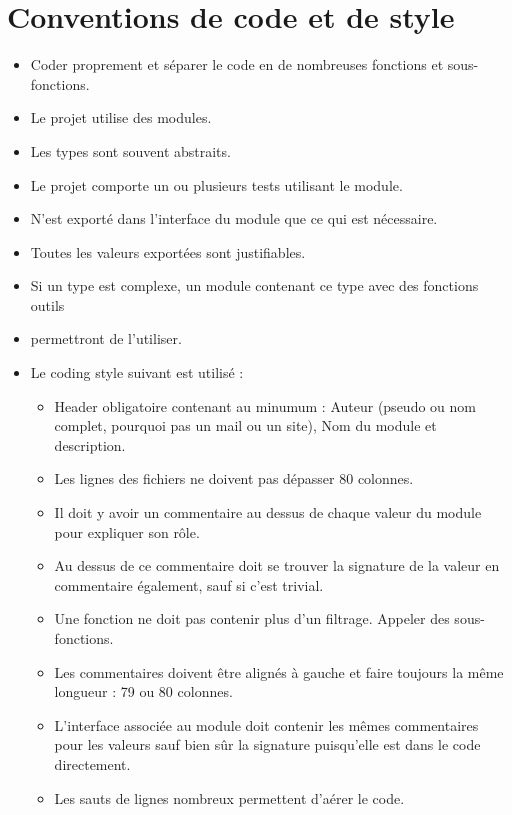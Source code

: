\documentclass{life-fr}
\begin{document}
\section{Conventions de code et de style}

\begin{itemize}
  \item Coder proprement et séparer le code en de nombreuses fonctions et sous-fonctions.
  \item Le projet utilise des modules.
  \item Les types sont souvent abstraits.
  \item Le projet comporte un ou plusieurs tests utilisant le module.
  \item N'est exporté dans l'interface du module que ce qui est nécessaire.
  \item Toutes les valeurs exportées sont justifiables.
  \item Si un type est complexe, un module contenant ce type avec des fonctions outils
  \item permettront de l'utiliser.
\newpage
  \item Le coding style suivant est utilisé :
    \begin{itemize}
      \item Header obligatoire contenant au minumum : Auteur (pseudo ou nom
        complet, pourquoi pas un mail ou un site), Nom du module et
        description.
      \item Les lignes des fichiers ne doivent pas dépasser 80 colonnes.
      \item Il doit y avoir un commentaire au dessus de chaque valeur du module
        pour expliquer son rôle.
      \item Au dessus de ce commentaire doit se trouver la signature de la
        valeur en commentaire également, sauf si c'est trivial.
      \item Une fonction ne doit pas contenir plus d'un filtrage. Appeler des
        sous-fonctions.
      \item Les commentaires doivent être alignés à gauche et faire toujours la
        même longueur : 79 ou 80 colonnes.
      \item L'interface associée au module doit contenir les mêmes commentaires
        pour les valeurs sauf bien sûr la signature puisqu'elle est dans le
        code directement.
      \item Les sauts de lignes nombreux permettent d'aérer le code.
    \end{itemize}
\end{itemize}
\end{document}
